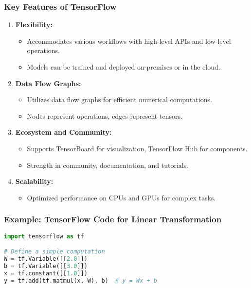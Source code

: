 \documentclass{beamer}
\begin{document}
\begin{frame}
    \frametitle{Key Features of TensorFlow}
    \begin{enumerate}
        \item \textbf{Flexibility:}
        \begin{itemize}
            \item Accommodates various workflows with high-level APIs and low-level operations.
            \item Models can be trained and deployed on-premises or in the cloud.
        \end{itemize}
        
        \item \textbf{Data Flow Graphs:}
        \begin{itemize}
            \item Utilizes data flow graphs for efficient numerical computations.
            \item Nodes represent operations, edges represent tensors.
        \end{itemize}

        \item \textbf{Ecosystem and Community:}
        \begin{itemize}
            \item Supports TensorBoard for visualization, TensorFlow Hub for components.
            \item Strength in community, documentation, and tutorials.
        \end{itemize}

        \item \textbf{Scalability:}
        \begin{itemize}
            \item Optimized performance on CPUs and GPUs for complex tasks.
        \end{itemize}
    \end{enumerate}
\end{frame}

\begin{frame}[fragile]
    \frametitle{Example: TensorFlow Code for Linear Transformation}
    \begin{lstlisting}[language=Python]
import tensorflow as tf

# Define a simple computation
W = tf.Variable([[2.0]])
b = tf.Variable([[3.0]])
x = tf.constant([[1.0]])
y = tf.add(tf.matmul(x, W), b)  # y = Wx + b
    \end{lstlisting}
\end{frame}
\end{document}
